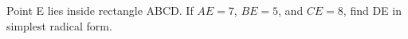 Point E lies inside rectangle ABCD. If $AE=7$, $BE=5$, and $CE=8$, find DE in simplest radical form.
